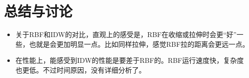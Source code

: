 \documentclass{article}
\begin{document}
	
	\section{总结与讨论}
	
	 \begin{itemize}
   \item	关于RBF和IDW的对比，直观上的感受是，RBF在收缩或拉伸时会更“好”一些，也就是会更加明显一点。比如同样拉伸，感觉RBF拉的距离会更远一点。
	 \end{itemize}
     \begin{itemize}
	\item	在性能上，能感受到IDW的性能是要差于RBF的。RBF运行速度快，复杂度也更低。不过时间原因，没有详细分析了。
	 \end{itemize}




	
	
	

	
\end{document}
